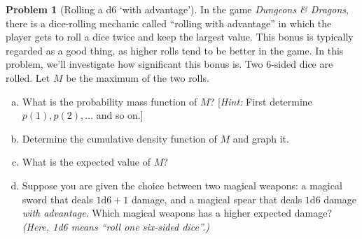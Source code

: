 \documentclass[10pt]{article}
\theoremstyle{definition}
\newtheorem{problem}[theorem]{Problem}
\newcommand{\1}[1]{\textbf{1}_{\left[#1\right]}} %
\begin{document}
\begin{problem}[Rolling a d6 `with advantage']
  In the game \textit{Dungeons \& Dragons}, there is a dice-rolling mechanic called ``rolling with
  advantage'' in which the player gets to roll a dice twice and keep the largest value. This bonus is
  typically regarded as a good thing, as higher rolls tend to be better in the game. In this problem,
  we'll investigate how significant this bonus is.
  Two 6-sided dice are rolled. Let $M$ be the maximum of the two rolls.
  \begin{enumerate}[(a)]
    \item What is the probability mass function of $M$? [\textit{Hint:} First determine $p(1),p(2),\ldots$ and so on.]
    \item Determine the cumulative density function of $M$ and graph it.
    \item What is the expected value of $M$?
    \item Suppose you are given the choice between two magical weapons: a magical sword that deals
    $1\text{d}6+1$ damage, and a magical spear that deals $1\text{d}6$ damage \textit{with advantage}.
    Which magical weapons has a higher expected damage? \textit{(Here, 1d6 means ``roll one six-sided
      dice''.)}
  \end{enumerate}
\end{problem}
\end{document}

